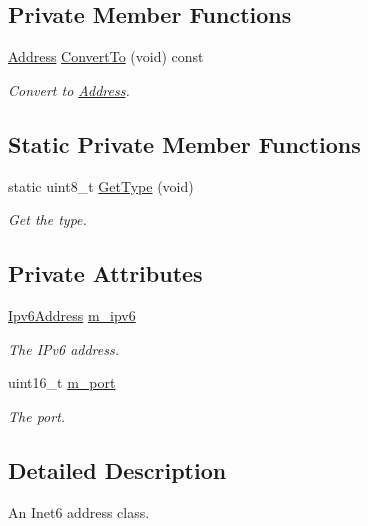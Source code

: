 \subsection*{Private Member Functions}
\begin{DoxyCompactItemize}
\item 
\hyperlink{classns3_1_1Address}{Address} \hyperlink{classns3_1_1Inet6SocketAddress_a93ebf6a07b34f788f83d8df93eccd446}{Convert\+To} (void) const 
\begin{DoxyCompactList}\small\item\em Convert to \hyperlink{classns3_1_1Address}{Address}. \end{DoxyCompactList}\end{DoxyCompactItemize}
\subsection*{Static Private Member Functions}
\begin{DoxyCompactItemize}
\item 
static uint8\+\_\+t \hyperlink{classns3_1_1Inet6SocketAddress_a92ecdd9962a0384fd374be86d6a18060}{Get\+Type} (void)
\begin{DoxyCompactList}\small\item\em Get the type. \end{DoxyCompactList}\end{DoxyCompactItemize}
\subsection*{Private Attributes}
\begin{DoxyCompactItemize}
\item 
\hyperlink{classns3_1_1Ipv6Address}{Ipv6\+Address} \hyperlink{classns3_1_1Inet6SocketAddress_ae9cdb1c6f2e612cb6ac97e17d6abb2b6}{m\+\_\+ipv6}
\begin{DoxyCompactList}\small\item\em The I\+Pv6 address. \end{DoxyCompactList}\item 
uint16\+\_\+t \hyperlink{classns3_1_1Inet6SocketAddress_a5ae16cc59dc8e88a70a6bef74864b446}{m\+\_\+port}
\begin{DoxyCompactList}\small\item\em The port. \end{DoxyCompactList}\end{DoxyCompactItemize}


\subsection{Detailed Description}
An Inet6 address class. 

